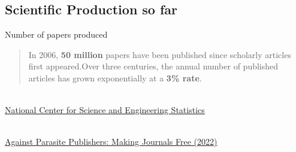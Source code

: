 \documentclass[10pt,compress,serif,aspectratio=169]{beamer}
\newcommand{\fig}[2]{\centering{\texttt{[image: \#2]}}}
\begin{document}
\subsection{Scientific Production so far}
   \begin{frame}[t]{Number of papers produced}

 \begin{quote}
 In 2006, \textbf{50 million} papers have been published since scholarly articles first appeared.\newline Over three centuries, the annual number of published articles has grown exponentially at a \textbf{3\% rate}.
 \end{quote}
 \pause
\begin{minipage}{.6\textwidth}
  \fig{1}{nsb20214-figpbs-001.pdf}\\
  {\tiny \href{https://ncses.nsf.gov/pubs/nsb20214/publication-output-by-country-region-or-economy-and-scientific-field}{National Center for Science and Engineering Statistics}}
\end{minipage}
\pause
 \begin{minipage}{.39\textwidth}
   \fig{.9}{publisher-shares}\\
   {\tiny    \href{https://doi.org/10.5281/zenodo.7212922}{Against Parasite Publishers: Making Journals Free (2022)}}
\end{minipage}
\end{frame}

\end{document}
